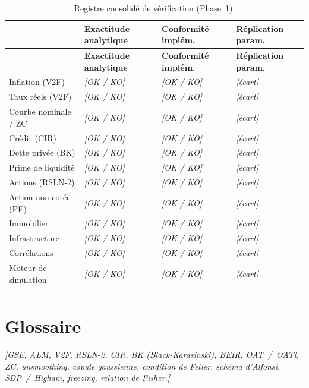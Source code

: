 \documentclass[11pt,a4paper]{article}
\newcommand{\tablehead}[1]{{\sffamily\bfseries\color{nxnavy}#1}}
\newcommand{\ph}[1]{\textcolor{nxgray}{\itshape #1}}
\begin{document}
\begingroup\small\setlength{\tabcolsep}{5pt}\renewcommand{\arraystretch}{1.3}
\begin{longtable}{>{\raggedright\arraybackslash}p{3.4cm}>{\raggedright\arraybackslash}p{2.9cm}>{\raggedright\arraybackslash}p{2.9cm}>{\raggedright\arraybackslash}p{2.9cm}}
\toprule
\tablehead{Composante} & \tablehead{Exactitude analytique} & \tablehead{Conformité implém.} & \tablehead{Réplication param.} \\
\midrule
\endfirsthead
\toprule
\tablehead{Composante} & \tablehead{Exactitude analytique} & \tablehead{Conformité implém.} & \tablehead{Réplication param.} \\
\midrule
\endhead
\bottomrule
\endfoot
\rowcolor{nxlightblue} Inflation (V2F) & \ph{[OK / KO]} & \ph{[OK / KO]} & \ph{[écart]} \\
Taux réels (V2F) & \ph{[OK / KO]} & \ph{[OK / KO]} & \ph{[écart]} \\
\rowcolor{nxlightblue} Courbe nominale / ZC & \ph{[OK / KO]} & \ph{[OK / KO]} & \ph{[écart]} \\
Crédit (CIR) & \ph{[OK / KO]} & \ph{[OK / KO]} & \ph{[écart]} \\
\rowcolor{nxlightblue} Dette privée (BK) & \ph{[OK / KO]} & \ph{[OK / KO]} & \ph{[écart]} \\
Prime de liquidité & \ph{[OK / KO]} & \ph{[OK / KO]} & \ph{[écart]} \\
\rowcolor{nxlightblue} Actions (RSLN-2) & \ph{[OK / KO]} & \ph{[OK / KO]} & \ph{[écart]} \\
Action non cotée (PE) & \ph{[OK / KO]} & \ph{[OK / KO]} & \ph{[écart]} \\
\rowcolor{nxlightblue} Immobilier & \ph{[OK / KO]} & \ph{[OK / KO]} & \ph{[écart]} \\
Infrastructure & \ph{[OK / KO]} & \ph{[OK / KO]} & \ph{[écart]} \\
\rowcolor{nxlightblue} Corrélations & \ph{[OK / KO]} & \ph{[OK / KO]} & \ph{[écart]} \\
Moteur de simulation & \ph{[OK / KO]} & \ph{[OK / KO]} & \ph{[écart]} \\
\caption{Registre consolidé de vérification (Phase~1).}
\label{tab:registre}
\end{longtable}
\endgroup

\section{Glossaire}
\ph{[GSE, ALM, V2F, RSLN-2, CIR, BK (Black-Karasinski), BEIR, OAT~/~OATi, ZC, \emph{unsmoothing}, copule gaussienne, condition de Feller, schéma d'Alfonsi, SDP~/~Higham, \emph{freezing}, relation de Fisher.]}
\end{document}
